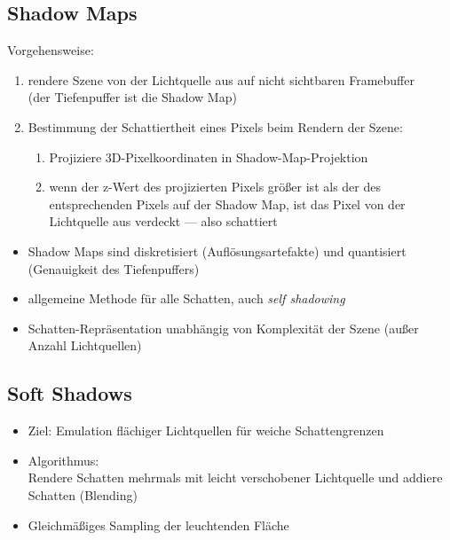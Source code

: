 \documentclass[a4paper, 12pt]{article}
\begin{document}
\subsection{Shadow Maps}
Vorgehensweise:
\begin{enumerate}
  \item rendere Szene von der Lichtquelle aus auf nicht sichtbaren Framebuffer\\
    (der Tiefenpuffer ist die Shadow Map)
  \item Bestimmung der Schattiertheit eines Pixels beim Rendern der Szene:
    \begin{enumerate}
      \item Projiziere 3D-Pixelkoordinaten in Shadow-Map-Projektion
      \item wenn der z-Wert des projizierten Pixels größer ist als der des entsprechenden Pixels auf der Shadow Map, ist das Pixel von der Lichtquelle aus verdeckt --- also schattiert
    \end{enumerate}
\end{enumerate}
\begin{itemize}
  \renewcommand{\labelitemi}{\(-\)}%
  \item Shadow Maps sind diskretisiert (Auflösungsartefakte) und quantisiert (Genauigkeit des Tiefenpuffers)
\end{itemize}
\begin{itemize}
  \renewcommand{\labelitemi}{+}%
  \item allgemeine Methode für alle Schatten, auch \emph{self shadowing}
  \item Schatten-Repräsentation unabhängig von Komplexität der Szene (außer Anzahl Lichtquellen)
\end{itemize}


\subsection{Soft Shadows}
\begin{itemize}
  \item Ziel: Emulation flächiger Lichtquellen für weiche Schattengrenzen
  \item Algorithmus:\\
    Rendere Schatten mehrmals mit leicht verschobener Lichtquelle und addiere Schatten (Blending)
  \item Gleichmäßiges Sampling der leuchtenden Fläche
\end{itemize}
\end{document}
